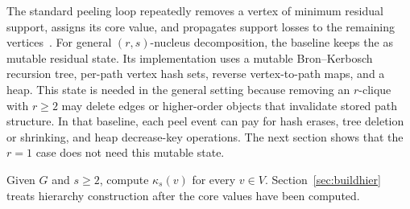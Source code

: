 \label{sec:prelim-peel}
The standard peeling loop repeatedly removes a vertex of minimum residual support, assigns its core value, and propagates support losses to the remaining vertices~\cite{coreAlg,NuclearCD}.
%
For general \((r,s)\)-nucleus decomposition, the baseline keeps the \cpi{} as mutable residual state.
%
Its implementation uses a mutable Bron--Kerbosch recursion tree, per-path vertex hash sets, reverse vertex-to-path maps, and a heap.
%
This state is needed in the general setting because removing an \(r\)-clique with \(r\ge2\) may delete edges or higher-order objects that invalidate stored path structure.
%
In that baseline, each peel event can pay for hash erases, tree deletion or shrinking, and heap decrease-key operations.
%
The next section shows that the \(r=1\) case does not need this mutable state.

Given \(G\) and \(s\ge2\), compute \(\kappa_s(v)\) for every \(v\in V\).
%
Section~\ref{sec:buildhier} treats hierarchy construction after the core values have been computed.
